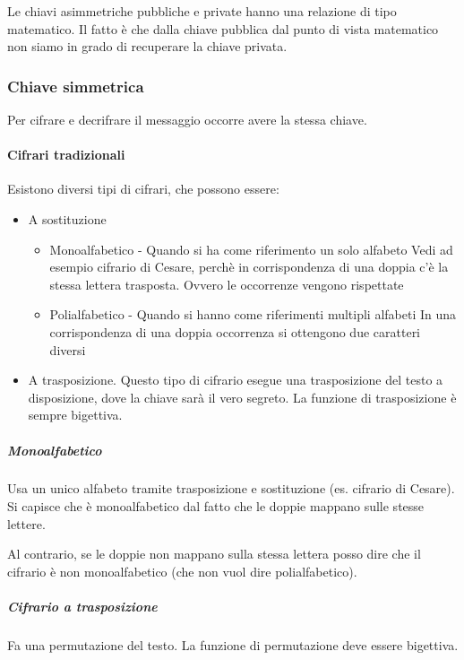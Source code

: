 
Le chiavi asimmetriche pubbliche e private hanno una relazione di tipo 
matematico. Il fatto è che dalla chiave pubblica dal punto di vista matematico 
non siamo in grado di recuperare la chiave privata.

\subsubsection{Chiave simmetrica}

Per cifrare e decrifrare il messaggio occorre avere la stessa chiave.

\paragraph{Cifrari tradizionali} Esistono diversi tipi di cifrari, che possono 
essere:
\begin{itemize}
\item A sostituzione
\begin{itemize}
 \item Monoalfabetico - Quando si ha come riferimento un solo alfabeto
 Vedi ad esempio cifrario di Cesare, perchè in corrispondenza di una doppia c'è 
la stessa lettera trasposta. Ovvero le occorrenze vengono rispettate
 \item Polialfabetico - Quando si hanno come riferimenti multipli alfabeti
 In una corrispondenza di una doppia occorrenza si ottengono due caratteri 
diversi
\end{itemize}
\item A trasposizione. Questo tipo di cifrario esegue una trasposizione del 
testo a disposizione, dove la chiave sarà il vero segreto. La funzione di 
trasposizione è sempre bigettiva.
\end{itemize}



\subparagraph{Monoalfabetico}

Usa un unico alfabeto tramite trasposizione e sostituzione (es. cifrario di 
Cesare). Si capisce che è monoalfabetico dal fatto che le doppie mappano sulle 
stesse lettere.

Al contrario, se le doppie non mappano sulla stessa lettera posso dire che il 
cifrario è non monoalfabetico (che non vuol dire polialfabetico).

\subparagraph{Cifrario a trasposizione}

Fa una permutazione del testo. La funzione di permutazione deve essere 
bigettiva.

